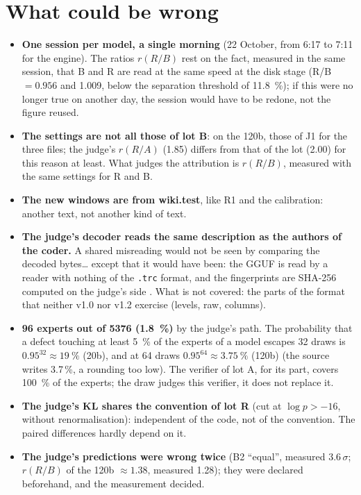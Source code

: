 \section{What could be wrong}\label{t3jug:sec:faux}

\begin{faux}
\begin{itemize}
\item \textbf{One session per model, a single morning} (22 October, from 6:17 to 7:11 for the engine). The ratios $r(R/B)$ rest on the fact, measured in the same session, that B and R are read at the same speed at the disk stage (R/B $= \num{0.956}$ and \num{1.009}, below the separation threshold of \SI{11.8}{\percent}); if this were no longer true on another day, the session would have to be redone, not the figure reused.
\item \textbf{The settings are not all those of lot B}: on the 120b, those of J1 for the three files; the judge's $r(R/A)$ (\num{1.85}) differs from that of the lot (2.00) for this reason at least. What judges the attribution is $r(R/B)$, measured with the same settings for R and B.
\item \textbf{The new windows are from wiki.test}, like R1 and the calibration: another text, not another kind of text.
\item \textbf{The judge's decoder reads the same description as the authors of the coder.} A shared misreading would not be seen by comparing the decoded bytes… except that it would have been: the GGUF is read by a reader with nothing of the \texttt{.trc} format, and the fingerprints are SHA-256 computed on the judge's side \parencite{fips180-4}. What is not covered: the parts of the format that neither v1.0 nor v1.2 exercise (levels, raw, columns).
\item \textbf{96 experts out of \num{5376} (\SI{1.8}{\percent})} by the judge's path. The probability that a defect touching at least \SI{5}{\percent} of the experts of a model escapes 32 draws is $0.95^{32} \approx \SI{19}{\percent}$ (20b), and at 64 draws $0.95^{64} \approx \SI{3.75}{\percent}$ (120b) \calc{} (the source writes 3.7\,\%, a rounding too low). The verifier of lot A, for its part, covers \SI{100}{\percent} of the experts; the draw judges this verifier, it does not replace it.
\item \textbf{The judge's KL shares the convention of lot R} (cut at $\log p > -16$, without renormalisation): independent of the code, not of the convention. The paired differences hardly depend on it.
\item \textbf{The judge's predictions were wrong twice} (B2 ``equal'', measured \num{3.6}\,$\sigma$; $r(R/B)$ of the 120b $\approx 1.38$, measured \num{1.28}); they were declared beforehand, and the measurement decided.

\end{itemize}
\end{faux}
